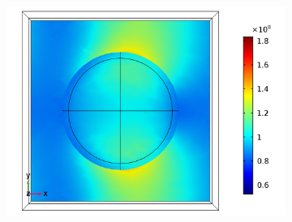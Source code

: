 \begin{figure}[htb!]
\begin{subfigure}{0.32\textwidth}
        \centering
        \includegraphics[width=\linewidth]{figures/ch4/S5A/FieldDistribution/Sample5A_TE_Slice@z=-05t_wl=500_notitle.png}
   \end{subfigure}
   \vspace{0.7cm}
   

\end{figure}
